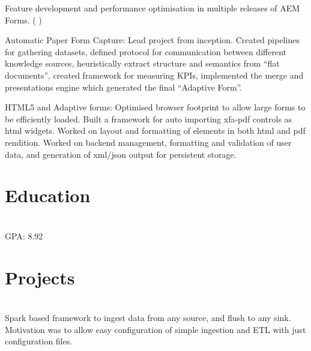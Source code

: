 \documentclass[]{deedy-resume-openfont}
\begin{document}
\hfill {}
\begin{tightemize}
	\item Feature development and performance optimisation in multiple releases of AEM Forms.\newline
    (
        {}
    )
	\item Automatic Paper Form Capture: Lead project from inception. Created pipelines for gathering datasets, defined protocol for communication between different knowledge sources, heuristically extract structure and semantics from “ﬂat documents”, created framework for measuring KPIs, implemented the merge and presentations engine which generated the final “Adaptive Form”.
	\item HTML5 and Adaptive forms: Optimised browser footprint to allow large forms to be efficiently loaded. Built a framework for auto importing xfa-pdf controls as html widgets. Worked on layout and formatting of elements in both html and pdf rendition. Worked on backend management, formatting and validation of user data, and generation of xml/json output for persistent storage.
\end{tightemize}
\sectionsep

%
%
\section{Education}
\raggedright

\hfill {}\\
GPA: 8.92\\
\sectionsep
%
%
\section{Projects}
\raggedright

\hfill {}\\
Spark based framework to ingest data from any source, and flush to any sink. Motivation was to allow easy configuration of simple ingestion and ETL with just configuration files.\\
\sectionsep
  
\end{document}
